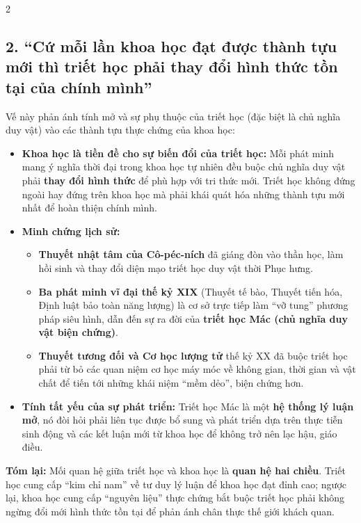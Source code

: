 \documentclass[9pt,a4paper]{extarticle}
\begin{document}
\begin{multicols*}{2}
\subsection*{2. ``Cứ mỗi lần khoa học đạt được thành tựu mới thì triết học phải thay đổi hình thức tồn tại của chính mình''}

Vế này phản ánh tính mở và sự phụ thuộc của triết học (đặc biệt là chủ nghĩa duy vật) vào các thành tựu thực chứng của khoa học:

\begin{itemize}
\item \textbf{Khoa học là tiền đề cho sự biến đổi của triết học:} Mỗi phát minh mang ý nghĩa thời đại trong khoa học tự nhiên đều buộc chủ nghĩa duy vật phải \textbf{thay đổi hình thức} để phù hợp với tri thức mới. Triết học không đứng ngoài hay đứng trên khoa học mà phải khái quát hóa những thành tựu mới nhất để hoàn thiện chính mình.
\item \textbf{Minh chứng lịch sử:}
  \begin{itemize}
  \item \textbf{Thuyết nhật tâm của Cô-péc-ních} đã giáng đòn vào thần học, làm hồi sinh và thay đổi diện mạo triết học duy vật thời Phục hưng.
  \item \textbf{Ba phát minh vĩ đại thế kỷ XIX} (Thuyết tế bào, Thuyết tiến hóa, Định luật bảo toàn năng lượng) là cơ sở trực tiếp làm ``vỡ tung'' phương pháp siêu hình, dẫn đến sự ra đời của \textbf{triết học Mác (chủ nghĩa duy vật biện chứng)}.
  \item \textbf{Thuyết tương đối và Cơ học lượng tử} thế kỷ XX đã buộc triết học phải từ bỏ các quan niệm cơ học máy móc về không gian, thời gian và vật chất để tiến tới những khái niệm ``mềm dẻo'', biện chứng hơn.
  \end{itemize}
\item \textbf{Tính tất yếu của sự phát triển:} Triết học Mác là một \textbf{hệ thống lý luận mở}, nó đòi hỏi phải liên tục được bổ sung và phát triển dựa trên thực tiễn sinh động và các kết luận mới từ khoa học để không trở nên lạc hậu, giáo điều.
\end{itemize}

\textbf{Tóm lại:} Mối quan hệ giữa triết học và khoa học là \textbf{quan hệ hai chiều}. Triết học cung cấp ``kim chỉ nam'' về tư duy lý luận để khoa học đạt đỉnh cao; ngược lại, khoa học cung cấp ``nguyên liệu'' thực chứng bắt buộc triết học phải không ngừng đổi mới hình thức tồn tại để phản ánh chân thực thế giới khách quan.

\end{multicols*}
\end{document}
